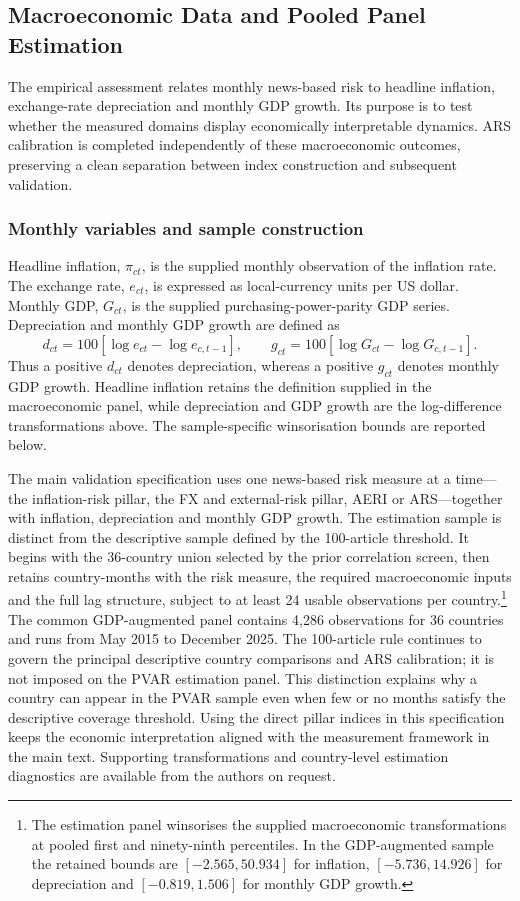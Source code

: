 \subsection{Macroeconomic Data and Pooled Panel Estimation}\label{sec:pooled_method}
The empirical assessment relates monthly news-based risk to headline inflation, exchange-rate depreciation and monthly GDP growth. Its purpose is to test whether the measured domains display economically interpretable dynamics. ARS calibration is completed independently of these macroeconomic outcomes, preserving a clean separation between index construction and subsequent validation.

\subsubsection{Monthly variables and sample construction}
Headline inflation, $\pi_{ct}$, is the supplied monthly observation of the inflation rate. The exchange rate, $e_{ct}$, is expressed as local-currency units per US dollar. Monthly GDP, $G_{ct}$, is the supplied purchasing-power-parity GDP series. Depreciation and monthly GDP growth are defined as
\begin{equation}
 d_{ct}=100[\log e_{ct}-\log e_{c,t-1}],\qquad
 g_{ct}=100[\log G_{ct}-\log G_{c,t-1}].\label{eq:macro_growth}
\end{equation}
Thus a positive $d_{ct}$ denotes depreciation, whereas a positive $g_{ct}$ denotes monthly GDP growth. Headline inflation retains the definition supplied in the macroeconomic panel, while depreciation and GDP growth are the log-difference transformations above. The sample-specific winsorisation bounds are reported below.

The main validation specification uses one news-based risk measure at a time---the inflation-risk pillar, the FX and external-risk pillar, AERI or ARS---together with inflation, depreciation and monthly GDP growth. The estimation sample is distinct from the descriptive sample defined by the 100-article threshold. It begins with the 36-country union selected by the prior correlation screen, then retains country-months with the risk measure, the required macroeconomic inputs and the full lag structure, subject to at least 24 usable observations per country.\footnote{The estimation panel winsorises the supplied macroeconomic transformations at pooled first and ninety-ninth percentiles. In the GDP-augmented sample the retained bounds are $[-2.565,50.934]$ for inflation, $[-5.736,14.926]$ for depreciation and $[-0.819,1.506]$ for monthly GDP growth.} The common GDP-augmented panel contains 4,286 observations for 36 countries and runs from May 2015 to December 2025. The 100-article rule continues to govern the principal descriptive country comparisons and ARS calibration; it is not imposed on the PVAR estimation panel. This distinction explains why a country can appear in the PVAR sample even when few or no months satisfy the descriptive coverage threshold. Using the direct pillar indices in this specification keeps the economic interpretation aligned with the measurement framework in the main text. Supporting transformations and country-level estimation diagnostics are available from the authors on request.

